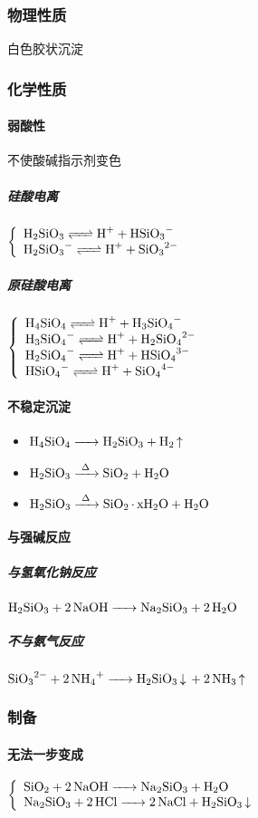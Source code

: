 \subsubsection{物理性质}
白色胶状沉淀
\subsubsection{化学性质}
\paragraph{弱酸性}
不使酸碱指示剂变色
\subparagraph{硅酸电离}
$\left\{\begin{array}{lr}
	\ce{H2SiO3 <=> H+ + HSiO3-}\\
	\ce{H2SiO3- <=> H+ + SiO3^2-}\\
\end{array}\right.$
\subparagraph{原硅酸电离}
$\left\{\begin{array}{lr}
	\ce{H4SiO4 <=> H+ + H3SiO4-}\\
	\ce{H3SiO4- <=> H+ + H2SiO4^2-}\\
	\ce{H2SiO4- <=> H+ + HSiO4^3-}\\
	\ce{HSiO4- <=> H+ + SiO4^4-}\\
\end{array}\right.$
\paragraph{不稳定沉淀}
\begin{itemize}
	\item $\ce{H4SiO4 -> H2SiO3 + H2 ^}$
	\item $\ce{H2SiO3 ->[\Delta] SiO2 + H2O}$
	\item $\ce{H2SiO3 ->[\Delta] SiO2*xH2O + H2O}$
\end{itemize}
\paragraph{与强碱反应}
\subparagraph{与氢氧化钠反应}
$\ce{H2SiO3 + 2NaOH -> Na2SiO3 + 2H2O}$
\subparagraph{不与氨气反应}
$\ce{SiO3^2- + 2NH4+ -> H2SiO3 v + 2NH3 ^}$
\subsubsection{制备}
\paragraph{无法一步变成}
$\left\{\begin{array}{lr}
	\ce{SiO2 + 2NaOH -> Na2SiO3 + H2O}\\
	\ce{Na2SiO3 + 2HCl -> 2NaCl + H2SiO3 v}\\
\end{array}\right.$

